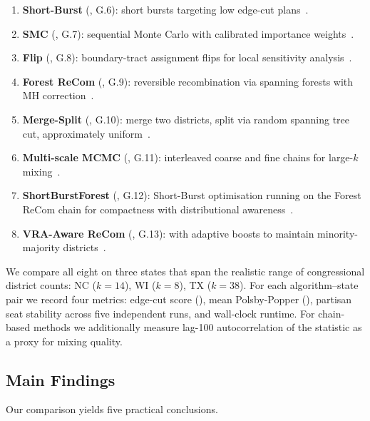 \begin{enumerate}
  \item \textbf{Short-Burst} (\sburst{}, G.6): short \recom{} bursts
        targeting low edge-cut plans~\citep{dellaLibera2026shortburst}.
  \item \textbf{SMC} (\smc{}, G.7): sequential Monte Carlo with
        calibrated importance weights~\citep{dellaLibera2026smc,mccartan2020}.
  \item \textbf{Flip} (\flip{}, G.8): boundary-tract assignment flips for
        local sensitivity analysis~\citep{dellaLibera2026flip}.
  \item \textbf{Forest ReCom} (\fr{}, G.9): reversible recombination
        via spanning forests with MH
        correction~\citep{dellaLibera2026forestRecom}.
  \item \textbf{Merge-Split} (\msp{}, G.10): merge two districts, split
        via random spanning tree cut, approximately
        uniform~\citep{dellaLibera2026mergeSplit}.
  \item \textbf{Multi-scale MCMC} (\ms{}, G.11): interleaved coarse and
        fine chains for large-$k$ mixing~\citep{dellaLibera2026multiscale}.
  \item \textbf{ShortBurstForest} (\sburstf{}, G.12): Short-Burst
        optimisation running on the Forest ReCom chain for compactness
        with distributional
        awareness~\citep{dellaLibera2026shortburstChains}.
  \item \textbf{VRA-Aware ReCom} (\vra{}, G.13): \recom{} with adaptive
        boosts to maintain minority-majority
        districts~\citep{dellaLibera2026vraAware}.
\end{enumerate}

We compare all eight on three states that span the realistic range of
congressional district counts: NC ($k = 14$), WI ($k = 8$), TX ($k = 38$).
For each algorithm--state pair we record four metrics: edge-cut score
(\ec{}), mean Polsby-Popper (\pp{}), partisan seat stability across five
independent runs, and wall-clock runtime.
For chain-based methods we additionally measure lag-100 autocorrelation
of the \ec{} statistic as a proxy for mixing quality.

\subsection{Main Findings}

Our comparison yields five practical conclusions.

